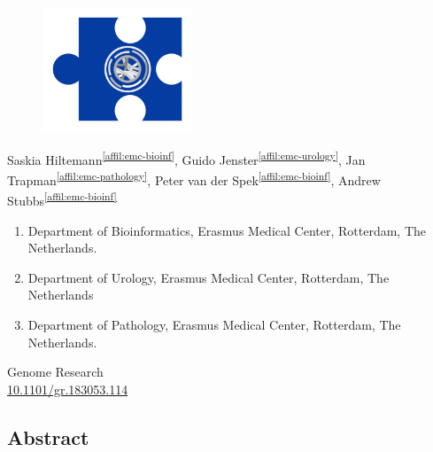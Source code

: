 \setcounter{NAT@ctr}{-1}
\chapter*{}

\begin{figure}[t!]
\centering
\includegraphics[height=10em]{frontmatter/images/chapter-header-variants.png}
\end{figure}
\vspace{-4cm}

{}
Saskia Hiltemann\textsuperscript{\ref{affil:emc-bioinf}},
Guido Jenster\textsuperscript{\ref{affil:emc-urology}},
Jan Trapman\textsuperscript{\ref{affil:emc-pathology}},
Peter van der Spek\textsuperscript{\ref{affil:emc-bioinf}},
Andrew Stubbs\textsuperscript{\ref{affil:emc-bioinf}}

\small
\begin{enumerate}
\itemsep-0.5em
\item Department of Bioinformatics, Erasmus Medical Center, Rotterdam, The Netherlands. \label{affil:emc-bioinf}
\item Department of Urology, Erasmus Medical Center, Rotterdam, The Netherlands \label{affil:emc-urology}
\item Department of Pathology, Erasmus Medical Center, Rotterdam, The Netherlands. \label{affil:emc-pathology}
\end{enumerate}

{\color{chaptergrey}{Published in:}} Genome Research \\
{\color{chaptergrey}{DOI:}} \hyperref[https://doi.org/10.1101/gr.183053.114]{10.1101/gr.183053.114}

\normalsize

\section*{Abstract}

